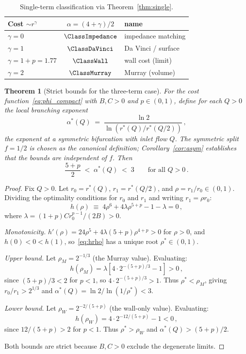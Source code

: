 \documentclass[11pt,a4paper]{article}
\newtheorem{theorem}{Theorem}
\theoremstyle{remark}
\begin{document}
\begin{table}[H]
\centering
\caption{Single-term classification via Theorem~\ref{thm:single}.}
\label{tab:classification}
\small
\begin{tabular}{@{}lcl@{}}
\toprule
Cost $\sim r^\gamma$ & $\alpha=(4+\gamma)/2$ & name \\
\midrule
$\gamma=0$ & $\ClassImpedance$ & impedance matching \\
$\gamma=1$ & $\ClassDaVinci$ & Da Vinci / surface \\
$\gamma=1+p=1.77$ & $\ClassWall$ & wall cost (limit) \\
$\gamma=2$ & $\ClassMurray$ & Murray (volume) \\
\bottomrule
\end{tabular}
\end{table}

\begin{theorem}[Strict bounds for the three-term case]
\label{thm:bounds}
For the cost function~\eqref{eq:phi_compact} with $B,C>0$ and $p\in(0,1)$,
define for each $Q>0$ the local branching exponent
\[
  \alpha^*(Q) \;=\; \frac{\ln 2}{\ln(r^*(Q)/r^*(Q/2))}\,,
\]
the exponent at a symmetric bifurcation with inlet flow $Q$.
The symmetric split $f=1/2$ is chosen as the canonical definition;
Corollary~\ref{cor:asym} establishes that the bounds are independent of $f$.
Then
\begin{equation}
  \frac{5+p}{2} \;<\; \alpha^*(Q) \;<\; 3 \qquad \text{for all }Q>0\,.
  \label{eq:bounds}
\end{equation}
\end{theorem}

\begin{proof}
Fix $Q>0$.
Let $r_0=r^*(Q)$, $r_1=r^*(Q/2)$, and $\rho=r_1/r_0\in(0,1)$.
Dividing the optimality conditions for $r_0$ and $r_1$ and writing $r_1=\rho
r_0$:
\begin{equation}
  h(\rho) \;\equiv\; 4\rho^6 + 4\lambda\rho^{5+p} - 1 - \lambda = 0\,,
  \label{eq:hrho}
\end{equation}
where $\lambda=(1+p)Cr_0^{p-1}/(2B)>0$.

\emph{Monotonicity.}
$h'(\rho)=24\rho^5+4\lambda(5+p)\rho^{4+p}>0$ for $\rho>0$,
and $h(0)<0<h(1)$, so~\eqref{eq:hrho} has a unique root $\rho^*\in(0,1)$.

\emph{Upper bound.}
Let $\rho_M=2^{-1/3}$ (the Murray value).
Evaluating:
\[
  h(\rho_M)=\lambda\!\left[4\cdot2^{-(5+p)/3}-1\right]>0\,,
\]
since $(5+p)/3<2$ for $p<1$, so $4\cdot2^{-(5+p)/3}>1$.
Thus $\rho^*<\rho_M$, giving $r_0/r_1>2^{1/3}$ and
$\alpha^*(Q)=\ln 2/\ln(1/\rho^*)<3$.

\emph{Lower bound.}
Let $\rho_W=2^{-2/(5+p)}$ (the wall-only value).
Evaluating:
\[
  h(\rho_W)=4\cdot2^{-12/(5+p)}-1<0\,,
\]
since $12/(5+p)>2$ for $p<1$.
Thus $\rho^*>\rho_W$ and $\alpha^*(Q)>(5+p)/2$.

Both bounds are strict because $B,C>0$ exclude the degenerate limits.
\end{proof}
\end{document}
